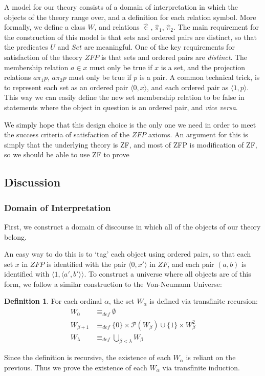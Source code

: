 \documentclass[11pt]{report}
\newcommand{\eqdef}{\equiv_\mathit{def}}
\newcommand{\pleft}{\mathrel{\pi_1}}
\newcommand{\pright}{\mathrel{\pi_2}}
\newcommand{\pair}[2]{\langle #1,#2 \rangle}
\newcommand{\zin}{\mathrel{\widehat{\in}}}
\newcommand{\zpright}{\mathrel{\widehat{\pi}_2}}
\newcommand{\zpleft}{\mathrel{\widehat{\pi}_1}}
\theoremstyle{definition}
\theoremstyle{theorem}
\theoremstyle{lemma}
\newtheorem{definition}{Definition}[section]
\begin{document}
A model for our theory consists of a domain of interpretation in which the objects of the theory range over, and a definition for each relation symbol.
More formally, we define a class $W$, and relations $\zin$, $\zpleft$, $\zpright$. 
The main requirement for the construction of this model is that sets and ordered pairs are distinct, so that the predicates $U$ and $\mathit{Set}$ are meaningful.
One of the key requirements for satisfaction of the theory $\mathit{ZFP}$ is that sets and ordered pairs are \emph{distinct}. 
The membership relation $a\in x$ must only be true if $x$ is a set, and the projection relations $a\pleft p$, $a\pright p$ must only be true if $p$ is a pair.
A common technical trick, is to represent each set as an ordered pair $\pair{0}{x}$, and each ordered pair as $\pair{1}{p}$.
This way we can easily define the new set membership relation to be false in statements where the object in question is an ordered pair, and \emph{vice versa}. 

We simply hope that this design choice is the only one we need in order to meet the success criteria of satisfaction of the $\mathit{ZFP}$ axioms. 
An argument for this is simply that the underlying theory is ZF, and most of ZFP is modification of ZF, so we should be able to use ZF to prove 

\subsection{Discussion}\label{zfpmodel}

\subsubsection{Domain of Interpretation}
First, we construct a domain of discourse in which all of the objects of our theory belong.

An easy way to do this is to `tag' each object using ordered pairs, so that each set $x$ in $\mathit{ZFP}$ is identified with the pair $\pair{0}{x'}$ in $\mathit{ZF}$, and each pair $(a,b)$ is identified with $\pair{1}{\pair{a'}{b'}}$. To construct a universe where all objects are of this form, we follow a similar construction to the Von-Neumann Universe:

\begin{definition} For each ordinal $\alpha$, the set $W_\alpha$ is defined via transfinite recursion:
\begin{align*}
 W_0 &\eqdef \emptyset\\
 W_{\beta+1} &\eqdef \{0\}\times\mathcal{P}(W_\beta) \cup \{1\}\times W_\beta^2 \\
 W_\lambda &\eqdef \bigcup_{\beta < \lambda} W_\beta
\end{align*}
\end{definition}
\noindent
Since the definition is recursive, the existence of each $W_\alpha$ is reliant on the previous. Thus we prove the existence of each $W_\alpha$ via transfinite induction.
\end{document}
